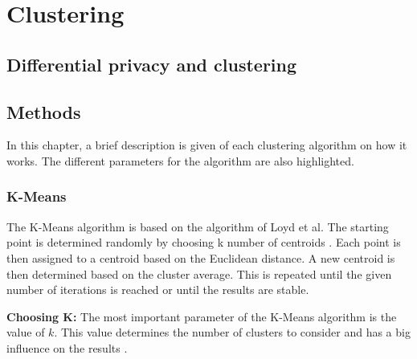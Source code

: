 \section{Clustering}

\subsection{Differential privacy and clustering}
\subsection{Methods}
In this chapter, a brief description is given of each clustering algorithm on how it works. The different parameters for the algorithm are also highlighted.
\subsubsection{K-Means} \label{theory:kmeans}
The K-Means algorithm is based on the algorithm of Loyd et al.
The starting point is determined randomly by choosing k number of centroids \citep{1056489}.
Each point is then assigned to a centroid based on the Euclidean distance.
A new centroid is then determined based on the cluster average.
This is repeated until the given number of iterations is reached or until the results are stable.

\textbf{Choosing K:} The most important parameter of the K-Means algorithm is the value of $k$.
This value determines the number of clusters to consider and has a big influence on the results \citep{ahmed_k-means_2020}.

